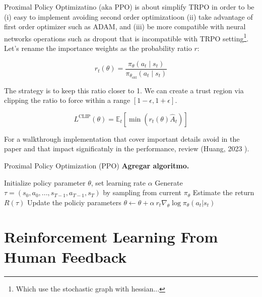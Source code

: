 \noindent Proximal Policy Optimizatino (aka PPO) is about simplify TRPO in order to be (i) easy to implement avoiding second order optimizatioon (ii) take advantage of first order optimizer such as ADAM, and (iii) be more compatible
with neural networks operations such as dropout that is incompatible with TRPO 
setting\footnote{Which use the stochastic graph with hessian...}. Let's rename the importance weights as the probability ratio $r$: 

\begin{equation}\label{eqn:importance-ratio-is}
    r_{t}(\theta) = \frac{\pi_{\theta}(a_{t}\mid s_{t})}{\pi_{\theta_{\text{old}}}(a_{t}\mid s_{t})}
\end{equation}

\noindent The strategy is to keep this ratio closer to 1. We can create a trust region via clipping the ratio to force within a range $\left[1-\epsilon, 1+\epsilon \right]$. 

\begin{equation}
    L^{\text{CLIP}}(\theta) = \mathbb{E}_{t} \left[ \min(r_{t}(\theta)\hat{A}_{t})\right]
\end{equation}

\noindent For a walkthrough implementation that cover important details avoid in the paper and that impact significatnly in the performance, review (Huang, 2023 \cite{dlr191986}).


\begin{algorithm}
    \caption{Proximal Policy Optimization (PPO) \textbf{Agregar algoritmo.}}
    \begin{algorithmic}
    \STATE Initialize policy parameter $\theta$, set learning rate $\alpha$
    \STATE Generate $\tau=(s_0, a_0, ..., s_{T-1}, a_{T-1}, s_{T})$ by sampling from current $\pi_{\theta}$
        \STATE Estimate the return $R(\tau)$
        \STATE Update the policiy parameters $\theta \leftarrow \theta + \alpha~r_{t}\nabla_{\theta}\log\pi_{\theta}(a_{t}|s_{t})$
    \ENDFOR
    \end{algorithmic}
\end{algorithm}



\section{Reinforcement Learning From Human Feedback}

